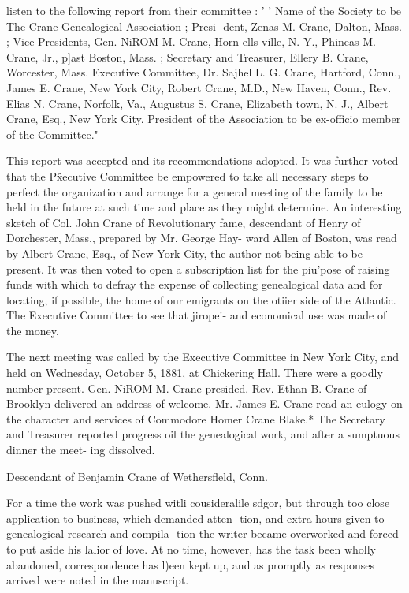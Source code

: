 listen to the following report from their committee : ' ' Name of 
the Society to be The Crane Genealogical Association ; Presi- 
dent, Zenas M. Crane, Dalton, Mass. ; Vice-Presidents, Gen. 
NiROM M. Crane, Horn ells ville, N. Y., Phineas M. Crane, Jr., 
p]ast Boston, Mass. ; Secretary and Treasurer, Ellery B. 
Crane, Worcester, Mass. Executive Committee, Dr. Sajhel 
L. G. Crane, Hartford, Conn., James E. Crane, New York 
City, Robert Crane, M.D., New Haven, Conn., Rev. Elias N. 
Crane, Norfolk, Va., Augustus S. Crane, Elizabeth town, N. 
J., Albert Crane, Esq., New York City. President of the 
Association to be ex-officio member of the Committee." 

This report was accepted and its recommendations adopted. 
It was further voted that the P\^xecutive Committee be empowered 
to take all necessary steps to perfect the organization and arrange 
for a general meeting of the family to be held in the future at 
such time and place as they might determine. An interesting 
sketch of Col. John Crane of Revolutionary fame, descendant 
of Henry of Dorchester, Mass., prepared by Mr. George Hay- 
ward Allen of Boston, was read by Albert Crane, Esq., of New 
York City, the author not being able to be present. It was then 
voted to open a subscription list for the piu'pose of raising funds 
with which to defray the expense of collecting genealogical data 
and for locating, if possible, the home of our emigrants on the 
otiier side of the Atlantic. The Executive Committee to see that 
jiropei- and economical use was made of the money. 

The next meeting was called by the Executive Committee in 
New York City, and held on Wednesday, October 5, 1881, at 
Chickering Hall. There were a goodly number present. Gen. 
NiROM M. Crane presided. Rev. Ethan B. Crane of Brooklyn 
delivered an address of welcome. Mr. James E. Crane read an 
eulogy on the character and services of Commodore Homer 
Crane Blake.* The Secretary and Treasurer reported progress 
oil the genealogical work, and after a sumptuous dinner the meet- 
ing dissolved. 



Descendant of Benjamin Crane of Wethersfleld, Conn. 



For a time the work was pushed witli cousideralile sdgor, but 
through too close application to business, which demanded atten- 
tion, and extra hours given to genealogical research and compila- 
tion the writer became overworked and forced to put aside his 
lalior of love. At no time, however, has the task been wholly 
abandoned, correspondence has l)een kept up, and as promptly as 
responses arrived were noted in the manuscript. 

